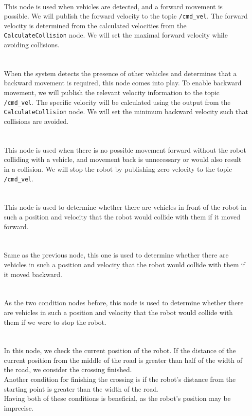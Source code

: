     \\
        This node is used when vehicles are detected, and a forward movement is possible. We will publish the forward velocity to the topic \texttt{/cmd\_vel}. The forward velocity is determined from the calculated velocities from the \texttt{CalculateCollision} node. We will set the maximal forward velocity while avoiding collisions.\\\\
    \\
        When the system detects the presence of other vehicles and determines that a backward movement is required, this node comes into play. To enable backward movement, we will publish the relevant velocity information to the topic \texttt{/cmd\_vel}. The specific velocity will be calculated using the output from the \texttt{CalculateCollision} node. We will set the minimum backward velocity such that collisions are avoided.\\\\
    \\
        This node is used when there is no possible movement forward without the robot colliding with a vehicle, and movement back is unnecessary or would also result in a collision. We will stop the robot by publishing zero velocity to the topic \texttt{/cmd\_vel}.\\\\
    \\
        This node is used to determine whether there are vehicles in front of the robot in such a position and velocity that the robot would collide with them if it moved forward.\\\\
    \\
        Same as the previous node, this one is used to determine whether there are vehicles in such a position and velocity that the robot would collide with them if it moved backward.\\\\
    \\
        As the two condition nodes before, this node is used to determine whether there are vehicles in such a position and velocity that the robot would collide with them if we were to stop the robot.\\\\
    \\
        In this node, we check the current position of the robot. If the distance of the current position from the middle of the road is greater than half of the width of the road, we consider the crossing finished.\\
        Another condition for finishing the crossing is if the robot's distance from the starting point is greater than the width of the road.\\
        Having both of these conditions is beneficial, as the robot's position may be imprecise.
